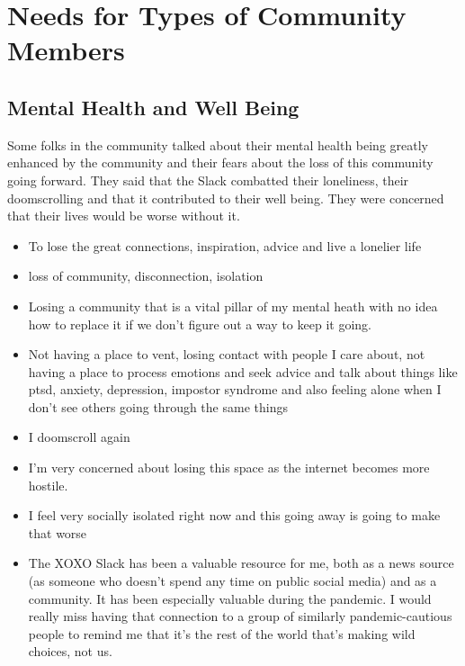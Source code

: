 \documentclass[
]{book}
\providecommand{\tightlist}{%
  \setlength{\itemsep}{0pt}\setlength{\parskip}{0pt}}
\begin{document}
\section{Needs for Types of Community Members}\label{needs-for-types-of-community-members}

\subsection{Mental Health and Well Being}\label{mental-health-and-well-being}

Some folks in the community talked about their mental health being greatly enhanced by the community and their fears about the loss of this community going forward. They said that the Slack combatted their loneliness, their doomscrolling and that it contributed to their well being. They were concerned that their lives would be worse without it.

\begin{itemize}
\tightlist
\item
  To lose the great connections, inspiration, advice and live a lonelier life
\item
  loss of community, disconnection, isolation
\item
  Losing a community that is a vital pillar of my mental heath with no idea how to replace it if we don't figure out a way to keep it going.
\item
  Not having a place to vent, losing contact with people I care about, not having a place to process emotions and seek advice and talk about things like ptsd, anxiety, depression, impostor syndrome and also feeling alone when I don't see others going through the same things
\item
  I doomscroll again
\item
  I'm very concerned about losing this space as the internet becomes more hostile.
\item
  I feel very socially isolated right now and this going away is going to make that worse
\item
  The XOXO Slack has been a valuable resource for me, both as a news source (as someone who doesn't spend any time on public social media) and as a community. It has been especially valuable during the pandemic. I would really miss having that connection to a group of similarly pandemic-cautious people to remind me that it's the rest of the world that's making wild choices, not us.
\end{itemize}
\end{document}
